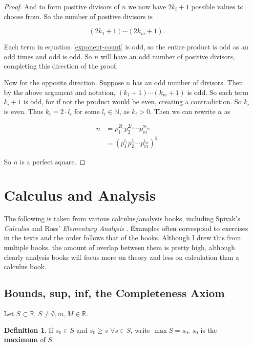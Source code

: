 \documentclass{article}
\theoremstyle{definition}
\newtheorem{definition}{Definition}[section]
\begin{document}
\begin{proof}
And to form positive divisors of $n$ we now have $2k_i + 1$ possible values to choose from. So the number of positive divisors is

\begin{equation} \label{exponent-count}
(2k_1 + 1) \cdots (2k_m + 1).
\end{equation}

Each term in equation \ref{exponent-count} is odd, so the entire product is odd as an odd times and odd is odd. So $n$ will have an odd number of positive divisors, completing this direction of the proof.

Now for the opposite direction. Suppose $n$ has an odd number of divisors. Then by the above argument and notation, $(k_1 + 1) \cdots (k_m + 1)$ is odd. So each term $k_i + 1$ is odd, for if not the product would be even, creating a contradiction. So $k_i$ is even. Thus $k_i = 2 \cdot l_i$ for some $l_i \in \mathbb{N}$, as $k_i > 0$. Then we can rewrite $n$ as

\begin{align*}
n &= p_1^{2l_1} p_2^{2l_2} \cdots p_m^{2l_m}  \\
&= \left(p_1^{l_1} p_2^{l_2} \cdots p_m^{l_m} \right)^2
\end{align*}

So $n$ is a perfect square.

\end{proof}

\section{Calculus and Analysis}

The following is taken from various calculus/analysis books, including Spivak's {\it Calculus} \cite{spivak} and Ross' {\it Elementary Analysis} \cite{ross}. Examples often correspond to exercises in the texts and the order follows that of the books. Although I drew this from multiple books, the amount of overlap between them is pretty high, although clearly analysis books will focus more on theory and less on calculation than a calculus book.

\subsection{Bounds, sup, inf, the Completeness Axiom}

Let $S \subset \mathbb{R}$, $S \neq \emptyset, m, M \in \mathbb{R}$. 

\begin{definition}
If $s_0 \in S$ and $s_0 \ge s$ $\forall s \in S$, write $\max S = s_0$. $s_0$ is the \textbf{maximum} of $S$.
\end{definition}
\end{document}
